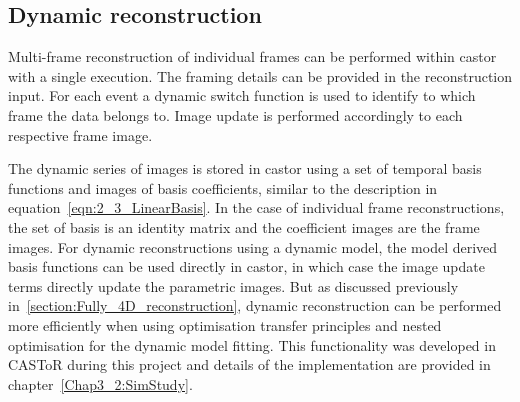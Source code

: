\subsection{Dynamic reconstruction}
Multi-frame reconstruction of individual frames can be performed within \gls{castor} with a single execution. The framing details can be provided in the reconstruction input. For each event a dynamic switch function is used to identify to which frame the data belongs to. Image update is performed accordingly to each respective frame image.

The dynamic series of images is stored in \gls{castor} using a set of temporal basis functions and images of basis coefficients, similar to the description in equation~\ref{eqn:2_3_LinearBasis}. 
In the case of individual frame reconstructions, the set of basis is an identity matrix and the coefficient images are the frame images. 
For dynamic reconstructions using a dynamic model, the model derived basis functions can be used directly in \gls{castor}, in which case the image update terms directly update the parametric images.
But as discussed previously in~\autoref{section:Fully_4D_reconstruction}, dynamic reconstruction can be performed more efficiently when using optimisation transfer principles and nested optimisation for the dynamic model fitting. This functionality was developed in CASToR during this project and details of the implementation are provided in chapter~\ref{Chap3_2:SimStudy}.

